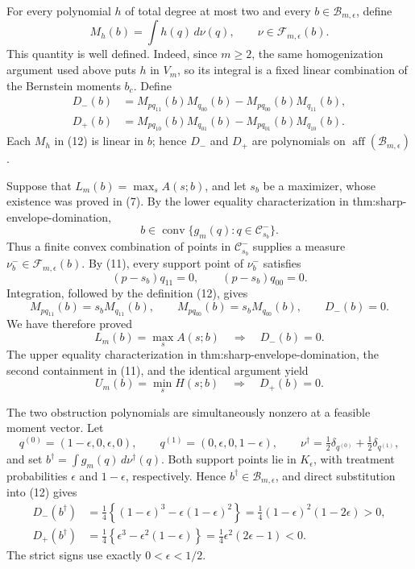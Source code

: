 For every polynomial \(h\) of total degree at most two and every
\(b\in\mathcal B_{m,\epsilon}\), define
\[
M_h(b)=\int h(q)\,d\nu(q),
\qquad \nu\in\mathcal F_{m,\epsilon}(b).
\]
This quantity is well defined. Indeed, since \(m\geq2\), the same
homogenization argument used above puts \(h\) in \(V_m\), so its integral is
a fixed linear combination of the Bernstein moments \(b_c\). Define
\[
\begin{aligned}
D_-(b)&=M_{p q_{11}}(b)M_{q_{00}}(b)
-M_{p q_{00}}(b)M_{q_{11}}(b),\\
D_+(b)&=M_{p q_{10}}(b)M_{q_{01}}(b)
-M_{p q_{01}}(b)M_{q_{10}}(b).
\end{aligned}                                                     \tag{12}
\]
Each \(M_h\) in (12) is linear in \(b\); hence \(D_-\) and \(D_+\) are
polynomials on \(\operatorname{aff}(\mathcal B_{m,\epsilon})\).

Suppose that
\(L_m(b)=\max_s A(s;b)\), and let \(s_b\) be a maximizer, whose existence
was proved in (7). By the lower equality characterization in
thm:sharp-envelope-domination,
\[
b\in\operatorname{conv}\{g_m(q):q\in\mathcal C_{s_b}^-\}.
\]
Thus a finite convex combination of points in \(\mathcal C_{s_b}^-\) supplies
a measure \(\nu_b^-\in\mathcal F_{m,\epsilon}(b)\). By (11), every support
point of \(\nu_b^-\) satisfies
\[
(p-s_b)q_{11}=0,
\qquad
(p-s_b)q_{00}=0.
\]
Integration, followed by the definition (12), gives
\[
M_{p q_{11}}(b)=s_bM_{q_{11}}(b),
\qquad
M_{p q_{00}}(b)=s_bM_{q_{00}}(b),
\qquad
D_-(b)=0.
\]
We have therefore proved
\[
L_m(b)=\max_s A(s;b)\quad\Longrightarrow\quad D_-(b)=0.           \tag{13}
\]
The upper equality characterization in thm:sharp-envelope-domination, the
second containment in (11), and the identical argument yield
\[
U_m(b)=\min_s H(s;b)\quad\Longrightarrow\quad D_+(b)=0.           \tag{14}
\]

The two obstruction polynomials are simultaneously nonzero at a feasible
moment vector. Let
\[
q^{(0)}=(1-\epsilon,0,\epsilon,0),
\qquad
q^{(1)}=(0,\epsilon,0,1-\epsilon),
\qquad
\nu^\dagger=\tfrac12\delta_{q^{(0)}}+\tfrac12\delta_{q^{(1)}},
\]
and set \(b^\dagger=\int g_m(q)\,d\nu^\dagger(q)\). Both support points lie
in \(K_{\epsilon}\), with treatment probabilities \(\epsilon\) and
\(1-\epsilon\), respectively. Hence
\(b^\dagger\in\mathcal B_{m,\epsilon}\), and direct substitution into (12)
gives
\[
\begin{aligned}
D_-(b^\dagger)
&=\frac14\left\{(1-\epsilon)^3-\epsilon(1-\epsilon)^2\right\}
=\frac14(1-\epsilon)^2(1-2\epsilon)>0,\\
D_+(b^\dagger)
&=\frac14\left\{\epsilon^3-\epsilon^2(1-\epsilon)\right\}
=\frac14\epsilon^2(2\epsilon-1)<0.                              \tag{15}
\end{aligned}
\]
The strict signs use exactly \(0<\epsilon<1/2\).

